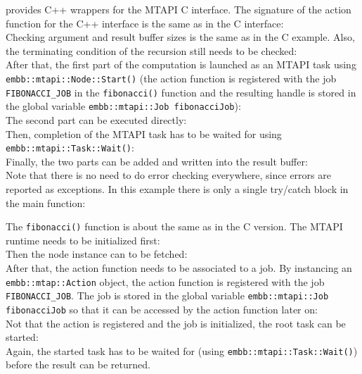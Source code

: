\embb provides C++ wrappers for the MTAPI C interface. The signature of the action function for the C++ interface is the same as in the C interface:
%
\\
%
Checking argument and result buffer sizes is the same as in the C example. Also, the terminating condition of the recursion still needs to be checked:
%
\\
%
After that, the first part of the computation is launched as an MTAPI task using \lstinline|embb::mtapi::Node::Start()| (the action function is registered with the job \lstinline|FIBONACCI_JOB| in the \lstinline|fibonacci()| function and the resulting handle is stored in the global variable \lstinline|embb::mtapi::Job fibonacciJob|):
%
\\
%
The second part can be executed directly:
%
\\
%
Then, completion of the MTAPI task has to be waited for using \lstinline|embb::mtapi::Task::Wait()|:
%
\\
%
Finally, the two parts can be added and written into the result buffer:
%
\\
% 
Note that there is no need to do error checking everywhere, since errors are reported as exceptions. In this example there is only a single try/catch block in the main function:
%
\\
%

The \lstinline|fibonacci()| function is about the same as in the C version. The MTAPI runtime needs to be initialized first:
%
\\
%
Then the node instance can to be fetched:
%
\\
%
After that, the action function needs to be associated to a job. By instancing an \lstinline|embb::mtap::Action| object, the action function is registered with the job \lstinline|FIBONACCI_JOB|. The job is stored in the global variable \lstinline|embb::mtapi::Job fibonacciJob| so that it can be accessed by the action function later on:
%
\\
%
Not that the action is registered and the job is initialized, the root task can be started:
%
\\
%
Again, the started task has to be waited for (using \lstinline|embb::mtapi::Task::Wait()|) before the result can be returned.

